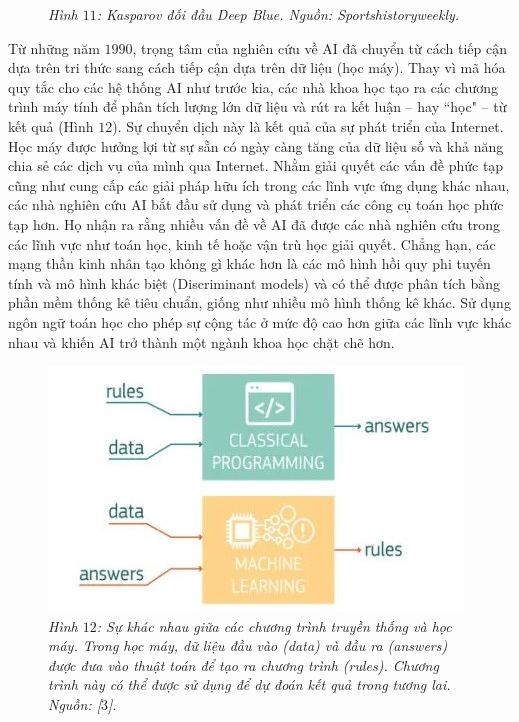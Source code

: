 \begin{multicols}{2}
\begin{figure}[H]
		\caption{\small\textit{\color{timhieukhoahoc}Hình $11$: Kasparov đối đầu Deep Blue. Nguồn: Sportshistoryweekly.}}
		\vspace*{-10pt}
	\end{figure}
	Từ những năm $1990$, trọng tâm của nghiên cứu về AI đã chuyển từ cách tiếp cận dựa trên tri thức sang cách tiếp cận dựa trên dữ liệu (học máy). Thay vì mã hóa quy tắc cho các hệ thống AI như trước kia, các nhà khoa học tạo ra các chương trình máy tính để phân tích lượng lớn dữ liệu và rút ra kết luận -- hay ``học" -- từ kết quả (Hình $12$). Sự chuyển dịch này là kết quả của sự phát triển của Internet. Học máy được hưởng lợi từ sự sẵn có ngày càng tăng của dữ liệu số và khả năng chia sẻ các dịch vụ của mình qua Internet. 
	\vskip 0.1cm
	Nhằm giải quyết các vấn đề phức tạp cũng như cung cấp các giải pháp hữu ích trong các lĩnh vực ứng dụng khác nhau, các nhà nghiên cứu AI bắt đầu sử dụng và phát triển các công cụ toán học phức tạp hơn. Họ nhận ra rằng nhiều vấn đề về AI đã được các nhà nghiên cứu trong các lĩnh vực như toán học, kinh tế hoặc vận trù học giải quyết. Chẳng hạn, các mạng thần kinh nhân tạo không gì khác hơn là các mô hình hồi quy phi tuyến tính và mô hình khác biệt (Discriminant models) và có thể được phân tích bằng phần mềm thống kê tiêu chuẩn, giống như nhiều mô hình thống kê khác. Sử dụng ngôn ngữ toán học cho phép sự cộng tác ở mức độ cao hơn giữa các lĩnh vực khác nhau và khiến AI trở thành một ngành khoa học chặt chẽ hơn.
	\begin{figure}[H]
		\vspace*{-5pt}
		\centering
		\captionsetup{labelformat= empty, justification=centering}
		\includegraphics[width= 0.9\linewidth]{ML-TraditionalProgramming.jpeg}
		\caption{\small\textit{\color{timhieukhoahoc}Hình $12$: Sự khác nhau giữa các chương trình truyền thống và học máy. Trong học máy, dữ liệu đầu vào (data) và đầu ra (answers) được đưa vào thuật toán để tạo ra chương trình (rules). Chương trình này có thể được sử dụng để dự đoán kết quả trong tương lai. Nguồn: [$3$].}}

\end{figure}
\end{multicols}
